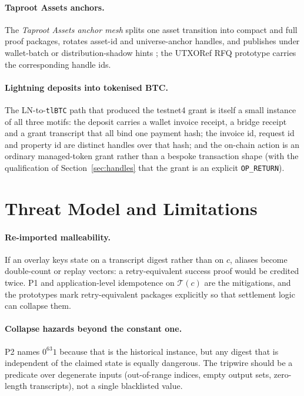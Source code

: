 \documentclass[11pt]{article}
\begin{document}
\paragraph{Taproot Assets anchors.} The \emph{Taproot Assets anchor mesh}
splits one asset transition into compact and full proof packages, rotates
asset-id and universe-anchor handles, and publishes under wallet-batch or
distribution-shadow hints \cite{osuntokun2022taprootassets}; the UTXORef RFQ
prototype carries the corresponding handle ids.

\paragraph{Lightning deposits into tokenised BTC.} The LN-to-\texttt{tlBTC}
path that produced the testnet4 grant is itself a small instance of all three
motifs: the deposit carries a wallet invoice receipt, a bridge receipt and a
grant transcript that all bind one payment hash; the invoice id, request id and
property id are distinct handles over that hash; and the on-chain action is an
ordinary managed-token grant rather than a bespoke transaction shape (with the
qualification of Section~\ref{sec:handles} that the grant is an explicit
\texttt{OP\_RETURN}).

\section{Threat Model and Limitations}
\label{sec:threats}

\paragraph{Re-imported malleability.} If an overlay keys state on a transcript
digest rather than on $c$, aliases become double-count or replay vectors: a
retry-equivalent success proof would be credited twice. P1 and application-level
idempotence on $\mathcal{T}(c)$ are the mitigations, and the prototypes mark
retry-equivalent packages explicitly so that settlement logic can collapse them.

\paragraph{Collapse hazards beyond the constant one.} P2 names $0^{63}1$ because
that is the historical instance, but any digest that is independent of the
claimed state is equally dangerous. The tripwire should be a predicate over
degenerate inputs (out-of-range indices, empty output sets, zero-length
transcripts), not a single blacklisted value.
\end{document}
